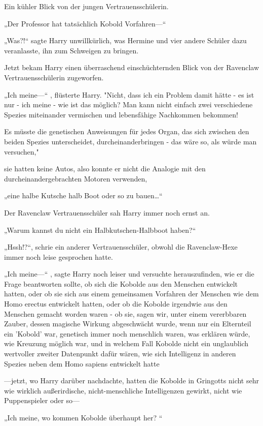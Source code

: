 {Ein kühler Blick von der jungen Vertrauensschülerin.

„Der Professor hat tatsächlich Kobold Vorfahren—“

„Was?!“ sagte Harry unwillkürlich, was Hermine und vier andere Schüler dazu veranlasste, ihn zum Schweigen zu bringen.

Jetzt bekam Harry einen überraschend einschüchternden Blick von der Ravenclaw Vertrauensschülerin zugeworfen.

„Ich meine—“ , flüsterte Harry. "Nicht, dass ich ein Problem damit hätte - es ist nur - ich meine - wie ist das möglich? Man kann nicht einfach zwei verschiedene Spezies miteinander vermischen und lebensfähige Nachkommen bekommen!

Es müsste die genetischen Anweisungen für jedes Organ, das sich zwischen den beiden Spezies unterscheidet, durcheinanderbringen - das wäre so, als würde man versuchen,"

sie hatten keine Autos, also konnte er nicht die Analogie mit den durcheinandergebrachten Motoren verwenden,

„eine halbe Kutsche halb Boot oder so zu bauen…“

Der Ravenclaw Vertrauensschüler sah Harry immer noch ernst an.

„Warum kannst du nicht ein Halbkutschen-Halbboot haben?“

„Hssh!?“, schrie ein anderer Vertrauensschüler, obwohl die Ravenclaw-Hexe immer noch leise gesprochen hatte.

„Ich meine—“ , sagte Harry noch leiser und versuchte herauszufinden, wie er die Frage beantworten sollte, ob sich die Kobolde aus den Menschen entwickelt hatten, oder ob sie sich aus einem gemeinsamen Vorfahren der Menschen wie dem Homo erectus entwickelt hatten, oder ob die Kobolde irgendwie aus den Menschen gemacht worden waren - ob sie, sagen wir, unter einem vererbbaren Zauber, dessen magische Wirkung abgeschwächt wurde, wenn nur ein Elternteil ein 'Kobold' war, genetisch immer noch menschlich waren, was erklären würde, wie Kreuzung möglich war, und in welchem Fall Kobolde nicht ein unglaublich wertvoller zweiter Datenpunkt dafür wären, wie sich Intelligenz in anderen Spezies neben dem Homo sapiens entwickelt hatte

—jetzt, wo Harry darüber nachdachte, hatten die Kobolde in Gringotts nicht sehr wie wirklich außerirdische, nicht-menschliche Intelligenzen gewirkt, nicht wie Puppenspieler oder so—

„Ich meine, wo kommen Kobolde überhaupt her? “

}
